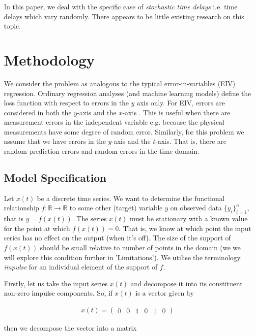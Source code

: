 \documentclass[11pt]{amsart}
\theoremstyle{definition}
\begin{document}
In this paper, we deal with the specific case of \emph{stochastic time delays} i.e. time delays which vary randomly. There appears to be little existing research on this topic.

\section{Methodology}

We consider the problem as analogous to the typical error-in-variables (EIV) regression. Ordinary regression analyses (and machine learning models) define the loss function with respect to errors in the $y$ axis only. For EIV, errors are considered in both the $y$-axis and the $x$-axis \cite{deming}. This is useful when there are measurement errors in the independent variable e.g. because the physical measurements have some degree of random error. Similarly, for this problem we assume that we have errors in the $y$-axis and the $t$-axis. That is, there are random prediction errors and random errors in the time domain. 

\subsection{Model Specification}

Let $x(t)$ be a discrete time series. We want to determine the functional relationship $f:\mathbb{R} \longrightarrow \mathbb{R}$ to some other (target) variable $y$ on observed data $\{y_i\}_{i=1}^{n}$, that is
$y = f(x(t))$.  The series $x(t)$ must be stationary with a known value for the point at which $f(x(t)) = 0$.  That is, we know at which point the input series has no effect on the output (when it’s off). The size of the support of $f(x(t))$ should be small relative to number of points in the domain (we we will explore this condition further in 'Limitations'). We utilise the terminology {\em impulse} for an individual element of the support of $f$.

Firstly, let us take the input series $x(t)$ and decompose it into its constituent non-zero impulse components. So, if $x(t)$ is a vector given by 

\begin{align*}
x(t) = 
\left(
\begin{array}{cccccc}
0 & 0 & 1 & 0 & 1 & 0
\end{array}  
\right)
\end{align*}

then we decompose the vector into a matrix 
\end{document}
